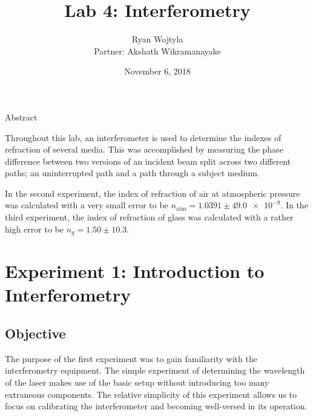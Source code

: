 \documentclass[12pt]{article}
\begin{document}

\begin{titlepage}

  \title{Lab 4: Interferometry}
  \author{Ryan Wojtyla \\Partner: Akshath Wikramanayake}
  \date{November 6, 2018}

  \maketitle

  \begin{center}
    Abstract
  \end{center}

  \qq Throughout this lab, an interferometer is used to determine the indexes of
  refraction of several media. This was accomplished by measuring the phase
  difference between two versions of an incident beam split across two different
  paths; an uninterrupted path and a path through a subject medium. 

  \qq In the second experiment, the index of refraction of air at atmospheric
  pressure was calculated with a very small error to be \(n_{\text{atm}} =
  \num{1.0391} \pm \num{49.0e-9}\). In the third experiment, the index of
  refraction of glass was calculated with a rather high error to be \(n_g = 1.50 \pm
  10.3\).

  \thispagestyle{empty}

\end{titlepage}



\section{Experiment 1: Introduction to Interferometry}

\subsection{Objective}

\qq The purpose of the first experiment was to gain familiarity with the
interferometry equipment. The simple experiment of determining the wavelength of
the laser makes use of the basic setup without introducing too many extraneous
components. The relative simplicity of this experiment allows us to focus on
calibrating the interferometer and becoming well-versed in its operation.
\end{document}
